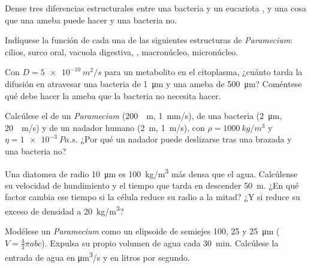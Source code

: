 \begin{exercise}[$\star$]\label{exo:b2:unicellular-diversity:3}
Dense tres diferencias estructurales entre una bacteria y un eucariota
, y una cosa que una ameba puede hacer y una bacteria no.
\end{exercise}

\begin{exercise}[$\star$]\label{exo:b2:unicellular-diversity:4}
Indíquese la función de cada una de las siguientes estructuras de
\emph{Paramecium}: cilios, surco oral, vacuola digestiva, , macronúcleo, micronúcleo.
\end{exercise}

\begin{exercise}[$\star\star$]\label{exo:b2:unicellular-diversity:5}
Con $D = \qty{5e-10}{m^2/s}$ para un metabolito en el citoplasma, ¿cuánto
tarda la difusión en atravesar una bacteria de \qty{1}{\micro m} y una
ameba de \qty{500}{\micro m}? Coméntese qué debe hacer la ameba que la
bacteria no necesita hacer.
\end{exercise}

\begin{exercise}[$\star\star$]\label{exo:b2:unicellular-diversity:6}
Calcúlese el  de un \emph{Paramecium} (\qty{200}{\micro
m}, \qty{1}{mm/s}), de una bacteria (\qty{2}{\micro m}, \qty{20}{\micro
m/s}) y de un nadador humano (\qty{2}{m}, \qty{1}{m/s}), con
$\rho = \qty{1000}{kg/m^3}$ y $\eta = \qty{1e-3}{Pa.s}$. ¿Por qué un
nadador puede deslizarse tras una brazada y una bacteria no?
\end{exercise}

\begin{exercise}[$\star\star$]\label{exo:b2:unicellular-diversity:7}
Una diatomea de radio \qty{10}{\micro m} es \qty{100}{kg/m^3} más densa
que el agua. Calcúlense su velocidad de hundimiento y el tiempo que
tarda en descender \qty{50}{m}. ¿En qué factor cambia ese tiempo si la
célula reduce su radio a la mitad? ¿Y si reduce su exceso de densidad a
\qty{20}{kg/m^3}?
\end{exercise}

\begin{exercise}[$\star\star$]\label{exo:b2:unicellular-diversity:8}
Modélese un \emph{Paramecium} como un elipsoide de semiejes \num{100},
\num{25} y \qty{25}{\micro m} ($V = \tfrac{4}{3}\pi abc$). Expulsa su
propio volumen de agua cada \qty{30}{min}. Calcúlese la entrada de agua
en \unit{\micro m^3/s} y en litros por segundo.
\end{exercise}

